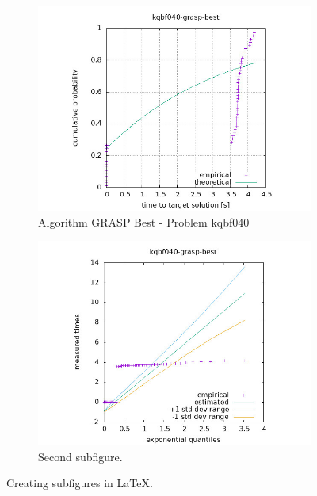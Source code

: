 \begin{figure}[H]
    \centering
    \begin{subfigure}{0.49\textwidth}
        \includegraphics[width=\textwidth]{figure/ttt_plot/kqbf040-grasp-best-exp.jpeg}
        \caption{Algorithm GRASP Best - Problem kqbf040}
        \label{fig:grasp-best-kqbf040-exp}
    \end{subfigure}
    \hfill
    \begin{subfigure}{0.49\textwidth}
        \includegraphics[width=\textwidth]{figure/ttt_plot/kqbf040-grasp-best-qq.jpeg}
        \caption{Second subfigure.}
        \label{fig:grasp-best-kqbf040-qq}
    \end{subfigure}
    \caption{Creating subfigures in \LaTeX.}
    \label{fig:grasp-best-kqbf040}
\end{figure}



